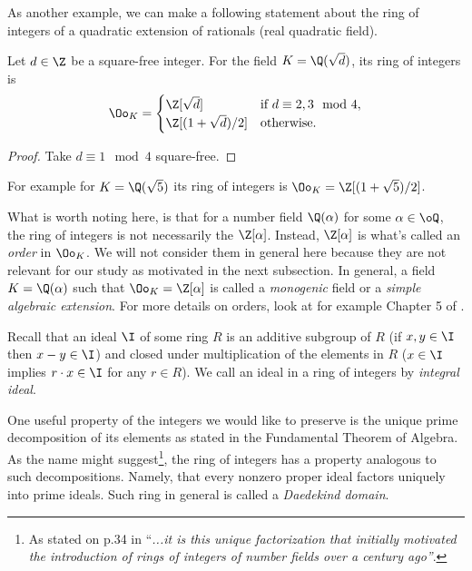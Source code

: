 As another example, we can make a following statement about the ring of integers of a quadratic extension of rationals (real quadratic field).
\begin{lemma}
     Let $d \in \Z$ be a square-free integer. For the field $K = \Q(\sqrt{d})$, its ring of integers is 
     \[ \Oo_K = 
	 \begin{cases} 
	     \Z[\sqrt{d}] & \text{if $d \equiv 2, 3 \mod 4$}, \\
	     \Z[(1 + \sqrt{d})/2] & \text{otherwise}.
     	 \end{cases}
     \]
\end{lemma}

\begin{proof}
	Take $d \equiv 1 \mod 4$ square-free.
\end{proof}
For example for $K = \Q(\sqrt{5})$ its ring of integers is $\Oo_K = \Z[(1 + \sqrt{5})/2]$. 
\begin{remark}\label{monogenic}
	What is worth noting here, is that for a number field $\Q(\alpha)$ for some $\alpha \in \oQ$, the ring of integers is not necessarily the $\Z[\alpha]$. Instead, $\Z[\alpha]$ is what's called an \textit{order} in $\Oo_K$. We will not consider them in general here because they are not relevant for our study as motivated in the next subsection. In general, a field $K = \Q(\alpha)$ such that $\Oo_K = \Z[\alpha]$ is called a \textit{monogenic} field or a \textit{simple algebraic extension}. For more details on orders, look at for example Chapter 5 of \cite{stein}.
\end{remark}

Recall that an ideal $\I$ of some ring $R$ is an additive subgroup of $R$ (if $x,y \in \I$ then $x-y \in \I$) and closed under multiplication of the elements in $R$ ($x \in \I$ implies $r \cdot x \in \I$ for any $r \in R$). We call an ideal in a ring of integers by \textit{integral ideal}.

One useful property of the integers we would like to preserve is the unique prime decomposition of its elements as stated in the Fundamental Theorem of Algebra. As the name might suggest\footnote{As stated on p.34 in \cite{stein} ``\textit{...it is this unique factorization that initially motivated the introduction of rings of integers of number fields over a century ago''}.}, the ring of integers has a property analogous to such decompositions. Namely, that every nonzero proper ideal factors uniquely into prime ideals. Such ring in general is called a \textit{Daedekind domain}.

